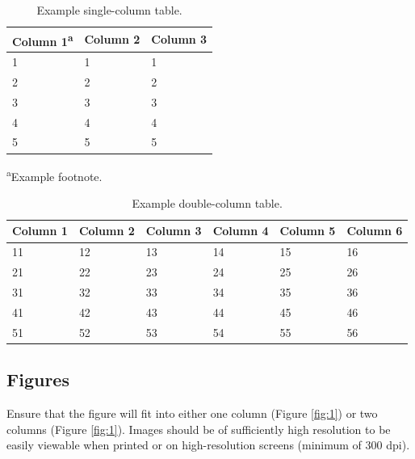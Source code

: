 \documentclass[twocolumn]{sintr}
\begin{document}
\begin{table}[b]
  	\centering\footnotesize\sffamily
  	\caption{Example single-column table.}
  	\begin{tableminipage}{\linewidth}
    	\begin{tabularx} {\linewidth}{XXX}
			\toprule
            Column 1\textsuperscript{a} & Column 2 & Column 3  \\            
	    	\midrule
             1 &  1 &  1 \\
             2 &  2 &  2 \\
             3 &  3 &  3 \\
             4 &  4 &  4 \\
             5 &  5 &  5 \\
            \bottomrule
    	\end{tabularx}
        \label{tab:1}
        \vskip0pt
        \textsuperscript{a}Example footnote.
  	\end{tableminipage}
\end{table}

\begin{table}[t]
  	\centering\footnotesize\sffamily
  	\caption{Example double-column table.}
  	\begin{tableminipage}{\linewidth}
    	\begin{tabularx} {\linewidth}{XXXXXX}
			\toprule
            Column 1 & Column 2 & Column 3 & Column 4 & Column 5 & Column 6 \\            
	    	\midrule
             11 &  12 &  13 &  14 &  15 &  16 \\
             21 &  22 &  23 &  24 &  25 &  26 \\
             31 &  32 &  33 &  34 &  35 &  36 \\
             41 &  42 &  43 &  44 &  45 &  46 \\
             51 &  52 &  53 &  54 &  55 &  56 \\
            \bottomrule
    	\end{tabularx}
        \label{tab:2}
  	\end{tableminipage}
\end{table}

\subsection{Figures}

Ensure that the figure will fit into either one column (Figure \ref{fig:1}) or two columns (Figure \ref{fig:1}). Images should be of sufficiently high resolution to be easily viewable when printed or on high-resolution screens (minimum of 300 dpi).
\end{document}
